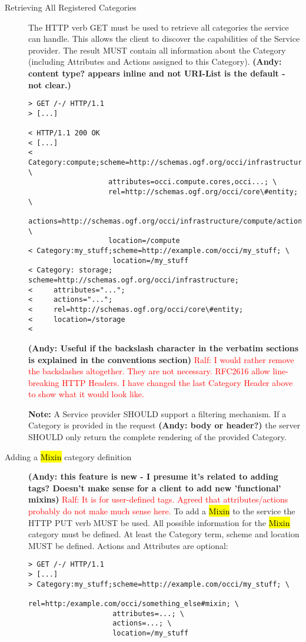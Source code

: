 \documentclass[10pt,a4paper]{article}
\newcommand{\ralf}[1]{\textcolor{red}{Ralf: #1}}
\begin{document}
\begin{description}
\item[Retrieving All Registered Categories] The HTTP verb GET must be
  used to retrieve all categories the service can handle. This allows
  the client to discover the capabilities of the Service provider. The
  result MUST contain all information about the Category (including
  Attributes and Actions assigned to this Category). \textbf{(Andy: content type? appears inline and not URI-List is the default - not clear.)}
\begin{verbatim}
> GET /-/ HTTP/1.1
> [...]
 
< HTTP/1.1 200 OK
< [...]
< Category:compute;scheme=http://schemas.ogf.org/occi/infrastructure; \
                   attributes=occi.compute.cores,occi...; \
                   rel=http://schemas.ogf.org/occi/core\#entity; \
                   actions=http://schemas.ogf.org/occi/infrastructure/compute/action#stop,...; \
                   location=/compute
< Category:my_stuff;scheme=http://example.com/occi/my_stuff; \
                    location=/my_stuff
< Category: storage; scheme=http://schemas.ogf.org/occi/infrastructure;
<     attributes="...";
<     actions="...";
<     rel=http://schemas.ogf.org/occi/core\#entity;
<     location=/storage
< 
\end{verbatim}
\textbf{(Andy: Useful if the backslash character in the verbatim sections 
is explained in the conventions section)}
\ralf{I would rather remove the backslashes altogether. They are not necessary.
RFC2616 allow line-breaking HTTP Headers.  I have changed the last Category
Header above to show what it would look like.}

\textbf{Note:} A Service provider SHOULD support a filtering
mechanism. If a Category is provided in the request \textbf{(Andy: body or header?)} the 
server SHOULD
only return the complete rendering of the provided Category.

\item[Adding a \hl{Mixin} category definition] \textbf{(Andy: this feature is new - 
I presume it's related to adding tags? Doesn't make sense for a client to add new 'functional' mixins)}
\ralf{It is for user-defined tags. Agreed that attributes/actions probably do not make much sense here.}
To add a \hl{Mixin} to
  the service the HTTP PUT verb MUST be used. All possible information
  for the \hl{Mixin} category must be defined. At least the Category
  term, scheme and location MUST be defined. Actions and Attributes
  are optional:
\begin{verbatim}
> GET /-/ HTTP/1.1
> [...]
> Category:my_stuff;scheme=http://example.com/occi/my_stuff; \
                    rel=http:/example.com/occi/something_else#mixin; \
                    attributes=...; \
                    actions=...; \
                    location=/my_stuff


\end{verbatim}
\end{description}
\end{document}

